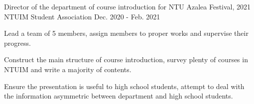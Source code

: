 

\begin{cventries}

  \cventry
    {Director of the department of course introduction for NTU Azalea Festival, 2021} %
    {NTUIM Student Association} %
    {} %
    {Dec. 2020 - Feb. 2021} %
    {
      \begin{cvitems} %
        \item {Lead a team of 5 members, assign members to proper works and supervise their progress.}
        \item {Construct the main structure of course introduction, survey plenty of courses in NTUIM and write a majority of contents.}
        \item {Ensure the presentation is useful to high school students, attempt to deal with the information asymmetric between department and high school students.}
      \end{cvitems}
    }

\end{cventries}

